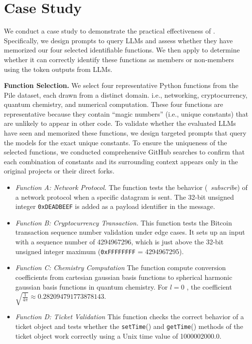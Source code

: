 
\section{Case Study}



We conduct a case study to demonstrate the practical effectiveness of \tool. Specifically, we design prompts to query LLMs and assess whether they have memorized our four selected identifiable functions. We then apply \tool to determine whether it can correctly identify these functions as members or non-members using the token outputs from LLMs.


\textbf{Function Selection.} We select four representative Python functions from the Pile dataset, each drawn from a distinct domain. i.e., networking, cryptocurrency, quantum chemistry, and numerical computation. These four functions are representative because they contain ``magic numbers'' (i.e., unique constants) that are unlikely to appear in other code. To validate whether the evaluated LLMs have seen and memorized these functions, we design targeted prompts that query the models for the exact unique constants. To ensure the uniqueness of the selected functions, we conducted comprehensive GitHub searches to confirm that each combination of constants and its surrounding context appears only in the original projects or their direct forks.

\begin{itemize}
\item \textit{Function A: Network Protocol.} The function tests the behavior (\eg~\textit{subscribe}) of a network protocol when a specific datagram is sent. The 32-bit unsigned integer \texttt{0xDEADBEEF} is added as a payload identifier in the message.
\item \textit{Function B: Cryptocurrency Transaction.} This function tests the Bitcoin transaction sequence number validation under edge cases. It sets up an input with a sequence number of 4294967296, which is just above the 32-bit unsigned integer maximum (\texttt{0xFFFFFFFF} = 4294967295).
\item \textit{Function C: Chemistry Computation} The function compute conversion coefficients from cartesian gaussian basis functions to spherical harmonic gaussian basis functions in quantum chemistry. For $l=0$ , the coefficient $\sqrt{\frac{1}{4\pi}} \approx 0.282094791773878143$.
\item \textit{Function D: Ticket Validation} This function checks the correct behavior of a ticket object and tests whether the \texttt{setTime}() and \texttt{getTime}() methods of the ticket object work correctly using a Unix time value of 1000002000.0.
\end{itemize}

